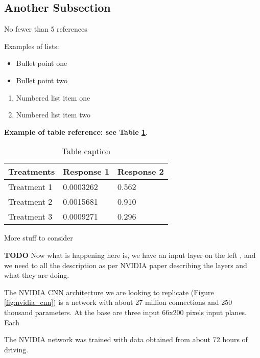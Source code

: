 \subsection{Another Subsection}

No fewer than 5 references



Examples of lists:
\begin{itemize}
\item Bullet point one
\item Bullet point two
\end{itemize}

\begin{enumerate}
\item Numbered list item one
\item Numbered list item two
\end{enumerate}

\textbf{Example of table reference: see Table \ref{tab:example}}.
\lipsum[4]

\begin{table}[ht] 
\centering
\begin{tabular}{l l l}
\hline
\textbf{Treatments} & \textbf{Response 1} & \textbf{Response 2}\\
\hline
Treatment 1 & 0.0003262 & 0.562 \\
Treatment 2 & 0.0015681 & 0.910 \\
Treatment 3 & 0.0009271 & 0.296 \\
\hline
\end{tabular}
\caption{Table caption}
\label{tab:example}
\end{table}

More stuff to consider \lipsum[1]

\textbf{TODO} Now what is happening here is, we have an input layer on the left , and we need to all the description as per NVIDIA paper describing the layers and what they are doing.

The NVIDIA CNN architecture we are looking to replicate (Figure \ref{fig:nvidia_cnn}) is a network with about 27 million connections and 250 thousand parameters. At the base are three input 66x200 pixels input planes. Each 

The NVIDIA network was trained with data obtained from about 72 hours of driving. 